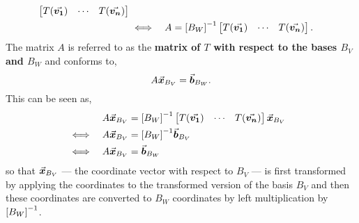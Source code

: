 \documentclass[MathsNotesBase.tex]{subfiles}
\begin{document}
{\begin{align*}
\begin{bmatrix}
					T(\vec{\bm{v_1}}) & \cdots & T(\vec{\bm{v_n}})
					\end{bmatrix} \\
		&\iff & A &= {[B_W]}^{-1}\begin{bmatrix}
					T(\vec{\bm{v_1}}) & \cdots & T(\vec{\bm{v_n}})
					\end{bmatrix}. &\text{\scriptsize{}} \\
		\end{align*}		
		The matrix $A$ is referred to as the \textbf{matrix of $T$ with respect to the bases $B_V$ and $B_W$} and conforms to,
		\[ A\vec{\bm{x}}_{B_V} = \vec{\bm{b}}_{B_W}. \]
		This can be seen as,
		\begin{align*}
		&& A\vec{\bm{x}}_{B_V} &= {[B_W]}^{-1}\begin{bmatrix}
						T(\vec{\bm{v_1}}) & \cdots & T(\vec{\bm{v_n}})
						\end{bmatrix}\vec{\bm{x}}_{B_V} \\
		&\iff & A\vec{\bm{x}}_{B_V} &= {[B_W]}^{-1}\vec{\bm{b}}_{B_V} &\text{\scriptsize{}} \\
		&\iff & A\vec{\bm{x}}_{B_V} &= \vec{\bm{b}}_{B_W} &\text{\scriptsize{}} \\
		\end{align*}
		so that ${ \vec{\bm{x}}_{B_V} }$ --- the coordinate vector with respect to $B_V$ --- is first transformed by applying the coordinates to the transformed version of the basis $B_V$ and then these coordinates are converted to $B_W$ coordinates by left multiplication by ${[B_W]}^{-1}$.\\\\		
		
		\medskip
}
\end{document}
